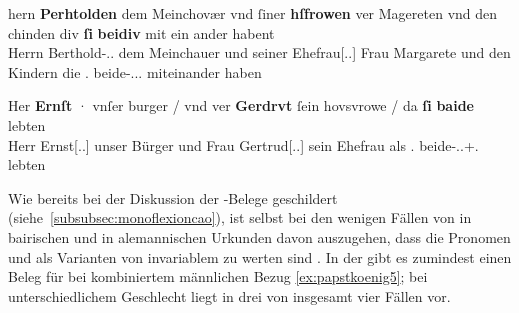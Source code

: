 \begin{exe}
\ex \label{ex:m+f_si_beide_iu}
	\begin{xlist}
	\ex \label{ex:m+f_si_beidiu}
		\gll hern \textbf{Perhtolden} dem Meinchovær vnd ſiner \textbf{hſfrowen} ver
				Magereten vnd den chinden div \textbf{ſi} \textbf{beidiv} {mit
				ein ander} habent \\
			Herrn Berthold-\Dat.\Sg.\MascM{} dem Meinchauer und seiner
				Ehefrau[\Dat.\Sg.\FemF] Frau Margarete und den Kindern die
				\Tpl\subMF.\Nom{} beide-\Nom.\Pl.\NeutMF.\St{} miteinander
				haben \\
		\begin{taggedline}{\parencites(Regensburg, 1287)[\pno~937, 292.40--41]{cao2}}
		\trans {}
		\end{taggedline}

	\ex \label{ex:m+f_si_beide}
		\gll Her \textbf{Ernſt} · vnſer burger / vnd ver \textbf{Gerdrvt} ſein
				hovsvrowe / da \textbf{ſi} \textbf{baide} lebten \\
			Herr Ernst[\Nom.\Sg.\MascM] {} unser Bürger {} und Frau
				Gertrud[\Nom.\Sg.\FemF] sein Ehefrau {} als \Tpl\subMF.\Nom{}
				beide-\Nom.\Pl.\M+\F\subMF.\St{} lebten \\
		\begin{taggedline}{\parencites(Wien, 1289)[\pno~1073, 374.40--41]{cao2}}
		\trans {}
		\end{taggedline}
	\end{xlist}
\end{exe}

Wie bereits bei der Diskussion der \CAO{}-Belege geschildert
(siehe~\cref{subsubsec:monoflexioncao}), ist selbst bei den wenigen Fällen von
 in bairischen und  in alemannischen Urkunden
davon auszugehen, dass die Pronomen  und  als Varianten von
invariablem  zu werten sind \autocite[vgl.][394--396]{ksw2}. In der
\KC{} gibt es zumindest einen Beleg für  bei kombiniertem
männlichen Bezug \cref{ex:papstkoenig5}; bei unterschiedlichem Geschlecht liegt
 in drei von insgesamt vier Fällen vor.

